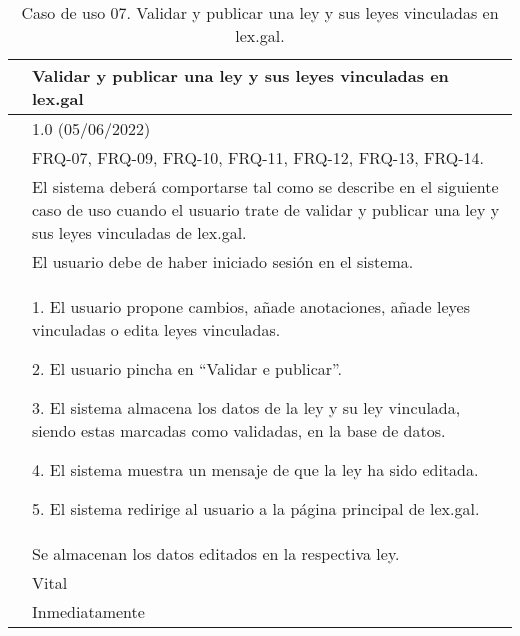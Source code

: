 \begin{table}[H]
\begin{center}
\begin{tabular}{|p{3cm}|p{10cm}|} \hline
\centering {\bf UC-07} & Validar y publicar una ley y sus leyes vinculadas en lex.gal  \\ \hline\hline
\centering {\bf Versión} & 1.0 (05/06/2022) \\ \hline
\centering {\bf Dependencias} & FRQ-07, FRQ-09, FRQ-10, FRQ-11, FRQ-12, FRQ-13, FRQ-14. \\ \hline
\centering {\bf Descripción} &  El sistema deberá comportarse tal como se describe en el siguiente caso de uso cuando el usuario trate de validar y publicar una ley y sus leyes vinculadas de lex.gal. \\ \hline
\centering {\bf Precondición} &  El usuario debe de haber iniciado sesión en el sistema. \\ \hline
\centering {\bf Secuencia normal} &  
1. El usuario propone cambios, añade anotaciones, añade leyes vinculadas o edita leyes vinculadas.

2. El usuario pincha en ``Validar e publicar''.

3. El sistema almacena los datos de la ley y su ley vinculada, siendo estas marcadas como validadas, en la base de datos.

4. El sistema muestra un mensaje de que la ley ha sido editada.

5. El sistema redirige al usuario a la página principal de lex.gal.
\\ \hline
\centering {\bf Postcondición} &  Se almacenan los datos editados en la respectiva ley. \\ \hline
\centering {\bf Importancia} & Vital \\ \hline
\centering {\bf Urgencia} & Inmediatamente \\ \hline
\end{tabular}
\caption{Caso de uso 07. Validar y publicar una ley y sus leyes vinculadas en lex.gal.}
\label{enlaceUC7}
\end{center}
\end{table}

